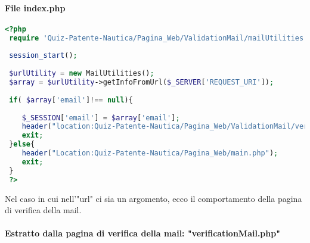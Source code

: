  \paragraph{File index.php}
  
 \begin{lstlisting}[language=php]
 <?php
 require 'Quiz-Patente-Nautica/Pagina_Web/ValidationMail/mailUtilities.php';
 
 session_start();
 
 $urlUtility = new MailUtilities();
 $array = $urlUtility->getInfoFromUrl($_SERVER['REQUEST_URI']);
 
 if( $array['email']!== null){	
 	
 	$_SESSION['email'] = $array['email'];
 	header("location:Quiz-Patente-Nautica/Pagina_Web/ValidationMail/verificationMail.php");
 	exit;
 }else{
 	header("Location:Quiz-Patente-Nautica/Pagina_Web/main.php");
 	exit;
 }
 ?>
 \end{lstlisting}
 
 Nel caso in cui nell'"url" ci sia un argomento, ecco il comportamento della pagina di verifica della mail.\\
 
\paragraph{Estratto dalla pagina di verifica della mail: "verificationMail.php"}
 
